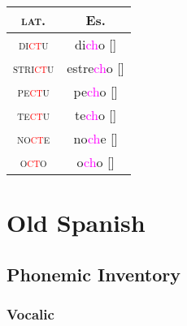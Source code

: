 \documentclass{report}
\begin{document}
\begin{tcolorbox}[title=Palatalization of cluster /kt/]

\end{tcolorbox}

\begin{tabular}{c c}
  \textsc{lat.} & Es. \\
  \hline
  \textsc{di\textcolor{red}{ct}u} & di\textcolor{magenta}{ch}o [\textipa{\textteshlig}] \\
  \textsc{stri\textcolor{red}{ct}u} & estre\textcolor{magenta}{ch}o [\textipa{\textteshlig}] \\
  \textsc{pe\textcolor{red}{ct}u} & pe\textcolor{magenta}{ch}o [\textipa{\textteshlig}] \\
  \textsc{te\textcolor{red}{ct}u} & te\textcolor{magenta}{ch}o [\textipa{\textteshlig}] \\
  \textsc{no\textcolor{red}{ct}e} & no\textcolor{magenta}{ch}e [\textipa{\textteshlig}] \\
  \textsc{o\textcolor{red}{ct}o} & o\textcolor{magenta}{ch}o [\textipa{\textteshlig}] \\
\end{tabular}




\chapter{Old Spanish}


\section{Phonemic Inventory}

\subsection{Vocalic}
\end{document}
